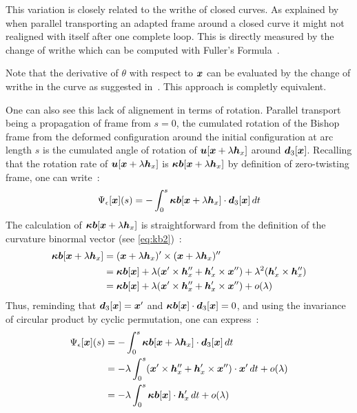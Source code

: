 This variation is closely related to the writhe of closed curves. As explained by  when parallel transporting an adapted frame around a closed curve it might not realigned with itself after one complete loop. This  is directly measured by the change of writhe which can be computed with Fuller's Formula~\cite{Fuller1978}.

Note that the derivative of $\theta$ with respect to $\boldsymbol{x}$ can be evaluated by the change of writhe in the curve as suggested in~\cite{deVries2005}. This approach is completly equivalent.

One can also see this lack of alignement in terms of rotation. Parallel transport being a propagation of frame from $s = 0$, the cumulated rotation of the Bishop frame from the deformed configuration around the initial configuration at arc length $s$ is the cumulated angle of rotation of $\boldsymbol{u}[\boldsymbol{x} + \lambda\boldsymbol{h}_x]$ around $\boldsymbol{d}_3[\boldsymbol{x}]$. Recalling that the rotation rate of $\boldsymbol{u}[\boldsymbol{x} + \lambda\boldsymbol{h}_x]$ is $\boldsymbol{\kappa b}[\boldsymbol{x} + \lambda\boldsymbol{h}_x]$ by definition of zero-twisting frame, one can write~:
\begin{equation}
	\Psi_\epsilon[\boldsymbol{x}](s) =
	-\int_0^s \boldsymbol{\kappa b}[\boldsymbol{x} + \lambda\boldsymbol{h}_x] \cdot \boldsymbol{d}_3[\boldsymbol{x}] \,dt
\end{equation}
The calculation of $\boldsymbol{\kappa b}[\boldsymbol{x} + \lambda\boldsymbol{h}_x]$ is straightforward from the definition of the curvature binormal vector (see \cref{eq:kb2})~:
\begin{equation}
	\begin{aligned}
	\boldsymbol{\kappa b}[\boldsymbol{x} + \lambda\boldsymbol{h}_x]
	&= (\boldsymbol{x} + \lambda\boldsymbol{h}_x)' \times (\boldsymbol{x} + \lambda\boldsymbol{h}_x)'' \\
	&= \boldsymbol{\kappa b}[\boldsymbol{x}] + \lambda(\boldsymbol{x}'\times\boldsymbol{h}''_x + \boldsymbol{h}'_x\times\boldsymbol{x}'') + \lambda^2(\boldsymbol{h}'_x \times \boldsymbol{h}''_x) \\
	&= \boldsymbol{\kappa b}[\boldsymbol{x}] + \lambda(\boldsymbol{x}'\times\boldsymbol{h}''_x + \boldsymbol{h}'_x\times\boldsymbol{x}'') + o(\lambda)
	\end{aligned}
\end{equation}
Thus, reminding that $\boldsymbol{d}_3[\boldsymbol{x}] = \boldsymbol{x}'$ and $\boldsymbol{\kappa b}[\boldsymbol{x}]\cdot\boldsymbol{d}_3[\boldsymbol{x}] = 0$, and using the invariance of circular product by cyclic permutation, one can express~:
\begin{equation}
	\begin{aligned}
		\Psi_\epsilon[\boldsymbol{x}](s)
		&= -\int_0^s \boldsymbol{\kappa b}[\boldsymbol{x} + \lambda\boldsymbol{h}_x] \cdot \boldsymbol{d}_3[\boldsymbol{x}] \,dt\\
		&= - \lambda \int_0^s (\boldsymbol{x}'\times\boldsymbol{h}''_x + \boldsymbol{h}'_x\times\boldsymbol{x}'') \cdot \boldsymbol{x}' \,dt + o(\lambda)\\
		&= - \lambda \int_0^s \boldsymbol{\kappa b}[\boldsymbol{x}]\cdot\boldsymbol{h}'_x \,dt + o(\lambda)\\
	\end{aligned}
\end{equation}
